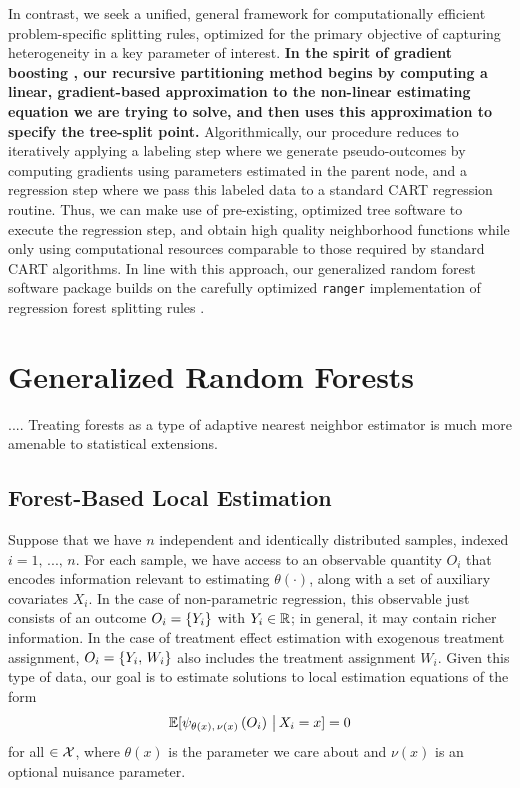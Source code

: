 \documentclass[aos]{imsart}
\theoremstyle{plain}
\theoremstyle{definition}
\theoremstyle{remark}
\begin{document}
\begin{CJK}{UTF8}{gbsn}
{In contrast, we seek a unified, general framework for computationally efficient problem-specific splitting rules,
optimized for the primary objective of capturing heterogeneity in a key parameter of interest.
\textbf{In the spirit of gradient boosting \citep{friedman2001greedy}, our recursive partitioning
method begins by computing a linear, gradient-based approximation to the
non-linear estimating equation we are trying to solve, and then uses
this approximation to specify the tree-split point.} Algorithmically, our procedure
reduces to iteratively applying a labeling step where we generate pseudo-outcomes
by computing gradients using parameters estimated in the parent node, and a regression step where we pass this labeled data
to a standard CART regression routine.  Thus, we can make use of pre-existing,
optimized tree software to execute the regression step, and obtain high quality
neighborhood functions while only using computational
resources comparable to those required by standard CART algorithms.  
In line with this approach, our generalized random forest software package
builds on the carefully optimized \texttt{ranger}
implementation of regression forest splitting rules \citep{wright2015ranger}.


\section{Generalized Random Forests}
.... Treating forests as a type of adaptive nearest neighbor estimator is much more amenable to statistical extensions.

\subsection{Forest-Based Local Estimation}
\label{sec:ANN}

Suppose that we have $n$ independent and identically distributed samples, indexed
$ i = 1, \, ..., \, n$. For each sample, we have
access to an observable quantity $O_i$ that encodes information
relevant to estimating $\theta(\cdot)$, along with a set of auxiliary covariates $X_i$. In the case of non-parametric
regression, this observable just consists of an outcome $O_i = \left\{Y_i\right\}$ with $Y_i \in \mathbb{R}$; in
general, it may contain richer information. In the case of treatment effect
estimation with exogenous treatment assignment, $O_i = \left\{Y_i, \, W_i\right\}$ also includes the treatment
assignment $W_i$.
Given this type of data, our goal is to estimate solutions to local estimation equations
of the form
\begin{equation*}
\mathbb{E}[\psi_{\theta(x), \, \nu(x)}\p{O_i} \cond X_i = x] = 0
\end{equation*}
 for all $\in \mathcal{X}$, where $\theta(x)$ is the parameter we care about and $\nu(x)$ is an optional
nuisance parameter.

}
\end{CJK}
\end{document}

